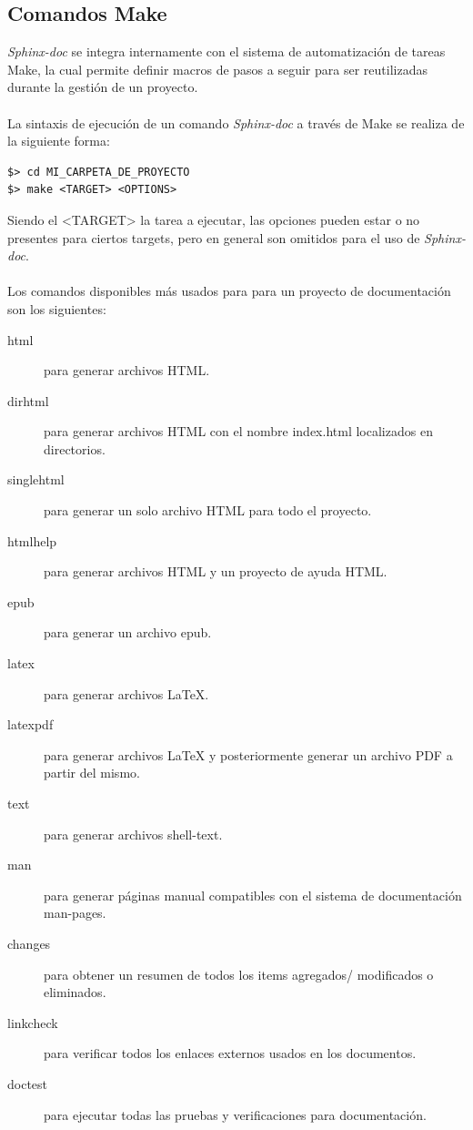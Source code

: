 \documentclass{sig-alternate}
\begin{document}
	\subsection{Comandos Make}
	
	\emph{Sphinx-doc} se integra internamente con el sistema de automatizaci\'on de 
	tareas Make, la cual permite definir macros de pasos a seguir
	para ser reutilizadas durante la gesti\'on de un proyecto. 
	\\ \\ 
	La sintaxis de ejecuci\'on de un comando \emph{Sphinx-doc} a trav\'es de Make 
	se realiza de la siguiente forma:
	
\begin{lstlisting}
$> cd MI_CARPETA_DE_PROYECTO
$> make <TARGET> <OPTIONS>
\end{lstlisting}

	Siendo el <TARGET> la tarea a ejecutar, las opciones pueden estar o no
	presentes para ciertos targets, pero en general son omitidos para el 
	uso de \emph{Sphinx-doc}. 
	\\ \\
	Los comandos disponibles m\'as usados para para un proyecto 
	de documentaci\'on son los siguientes:
	
	\begin{description}
	 \item[html] para generar archivos HTML.
	 \item[dirhtml] para generar archivos HTML con el nombre index.html
	  localizados en directorios.
	 \item[singlehtml] para generar un solo archivo HTML para todo el 
	  proyecto.
	 \item[htmlhelp] para generar archivos HTML y un proyecto de ayuda
	  HTML.
	 \item[epub] para generar un archivo epub.
	 \item[latex] para generar archivos LaTeX.
	 \item[latexpdf] para generar archivos LaTeX y posteriormente generar
	  un archivo PDF a partir del mismo.
	 \item[text] para generar archivos shell-text.
	 \item[man] para generar p\'aginas manual compatibles con el sistema
	  de documentaci\'on man-pages.
	 \item[changes] para obtener un resumen de todos los items agregados/
	 modificados o eliminados.
	 \item[linkcheck] para verificar todos los enlaces externos usados 
	  en los documentos.
	 \item[doctest] para ejecutar todas las pruebas y verificaciones 
	  para documentaci\'on.
	\end{description}
\end{document}
